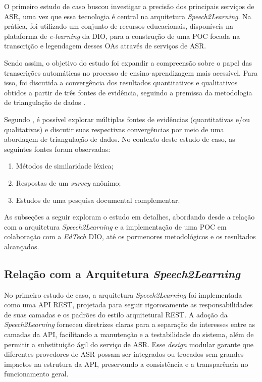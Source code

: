 O primeiro estudo de caso buscou investigar a precisão dos principais serviços de ASR, uma vez que essa tecnologia é central na arquitetura \textit{Speech2Learning}. Na prática, foi utilizado um conjunto de recursos educacionais, disponíveis na plataforma de \textit{e-learning} da DIO, para a construção de uma POC focada na transcrição e legendagem desses OAs através de serviços de ASR.

Sendo assim, o objetivo do estudo foi expandir a compreensão sobre o papel das transcrições automáticas no processo de ensino-aprendizagem mais acessível. Para isso, foi discutida a convergência dos resultados quantitativos e qualitativos obtidos a partir de três fontes de evidência, seguindo a premissa da metodologia de triangulação de dados \cite{LimaJunior2021}.

Segundo \cite{Farquhar2020}, é possível explorar múltiplas fontes de evidências (quantitativas e/ou qualitativas) e discutir suas respectivas convergências por meio de uma abordagem de triangulação de dados. No contexto deste estudo de caso, as seguintes fontes foram observadas: 
\begin{enumerate}[label=(\roman*)]
    \item Métodos de similaridade léxica;
    \item Respostas de um \textit{survey} anônimo;
    \item Estudos de uma pesquisa documental complementar.
\end{enumerate}

As subseções a seguir exploram o estudo em detalhes, abordando desde a relação com a arquitetura \textit{Speech2Learning} e a implementação de uma POC em colaboração com a \textit{EdTech} DIO, até os pormenores metodológicos e os resultados alcançados.

\subsection{Relação com a Arquitetura \textit{Speech2Learning}}

No primeiro estudo de caso, a arquitetura \textit{Speech2Learning} foi implementada como uma API REST, projetada para seguir rigorosamente as responsabilidades de suas camadas e os padrões do estilo arquitetural REST. A adoção da \textit{Speech2Learning} forneceu diretrizes claras para a separação de interesses entre as camadas da API, facilitando a manutenção e a testabilidade do sistema, além de permitir a substituição ágil do serviço de ASR. Esse \textit{design} modular garante que diferentes provedores de ASR possam ser integrados ou trocados sem grandes impactos na estrutura da API, preservando a consistência e a transparência no funcionamento geral.

